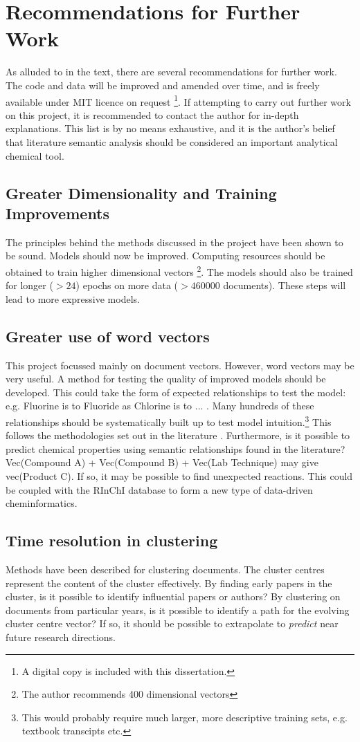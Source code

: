 \chapter{Recommendations for Further Work}
\label{chapt:RECOMMENDATIONS}
As alluded to in the text, there are several recommendations for further work. The code and data will be improved and amended over time, and is freely available under MIT licence on request \footnote{A digital copy is included with this dissertation.}. If attempting to carry out further work on this project, it is recommended to contact the author for in-depth explanations. This list is by no means exhaustive, and it is the author's belief that literature semantic analysis should be considered an important analytical chemical tool.
\section{Greater Dimensionality and Training Improvements}
The principles behind the methods discussed in the project have been shown to be sound. Models should now be improved. Computing resources should be obtained to train higher dimensional vectors \footnote{ The author recommends 400 dimensional vectors}. The models should also be trained for longer ($> 24$) epochs on more data ($> 460000$ documents). These steps will lead to more expressive models.
\section{Greater use of word vectors}
This project focussed mainly on document vectors. However, word vectors may be very useful. A method for testing the quality of improved models should be developed. This could take the form of expected relationships to test the model: e.g. Fluorine is to Fluoride as Chlorine is to ... . Many hundreds of these relationships should be systematically built up to test model intuition.\footnote{This would probably require much larger, more descriptive training sets, e.g. textbook transcipts etc.} This follows the methodologies set out in the literature \cite{word2vec1} \cite{word2vec2}. Furthermore, is it possible to predict chemical properties using semantic relationships found in the literature? Vec(Compound A) + Vec(Compound B) + Vec(Lab Technique) may give vec(Product C). If so, it may be possible to find unexpected reactions. This could be coupled with the RInChI database to form a new type of data-driven cheminformatics.
\section{Time resolution in clustering}
Methods have been described for clustering documents. The cluster centres represent the content of the cluster effectively. By finding early papers in the cluster, is it possible to identify influential papers or authors?
By clustering on documents from particular years, is it possible to identify a path for the evolving cluster centre vector? If so, it should be possible to extrapolate to \emph{predict} near future research directions.
